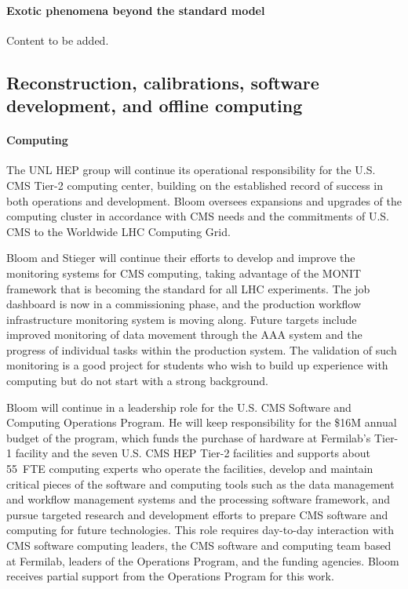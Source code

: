 \paragraph{Exotic phenomena beyond the standard model}
 Content to be added.


\subsection{Reconstruction, calibrations, software development, and offline computing}

\paragraph{Computing} The UNL HEP group will continue its operational responsibility for the U.S. CMS Tier-2 computing center, building on the established record of success in both operations and development. Bloom oversees expansions and upgrades of the computing cluster in accordance with CMS needs and the commitments of U.S. CMS to the Worldwide LHC Computing Grid.

Bloom and Stieger will continue their efforts to develop and improve the monitoring systems for CMS computing, taking advantage of the MONIT framework that is becoming the standard for all LHC experiments.  The job dashboard is now in a commissioning phase, and the production workflow infrastructure monitoring system is moving along.  Future targets include improved monitoring of data movement through the AAA system and the progress of individual tasks within the production system.  The validation of such monitoring is a good project for students who wish to build up experience with computing but do not start with a strong background.

Bloom will continue in a leadership role for the U.S. CMS Software and Computing Operations Program.  He will keep responsibility for the \$16M annual budget of the program, which funds the purchase of hardware at Fermilab's Tier-1 facility and the seven U.S. CMS HEP Tier-2 facilities and supports about 55~FTE computing experts who operate the facilities, develop and maintain critical pieces of the software and computing tools such as the data management and workflow management systems and the processing software framework, and pursue targeted research and development efforts to prepare CMS software and computing for future technologies.  This role requires day-to-day interaction with CMS software computing leaders, the CMS software and computing team based at Fermilab, leaders of the Operations Program, and the funding agencies.  Bloom receives partial support from the Operations Program for this work.

